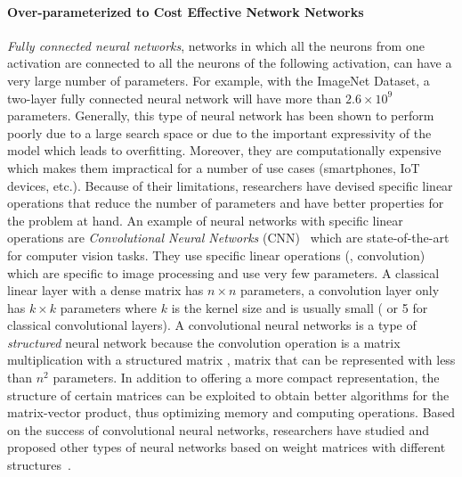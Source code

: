 \paragraph{Over-parameterized to Cost Effective Network Networks}
\emph{Fully connected neural networks}, networks in which all the neurons from one activation are connected to all the neurons of the following activation, can have a very large number of parameters.
For example, with the ImageNet Dataset, a two-layer fully connected neural network will have more than $2.6 \times 10^9$ parameters.
Generally, this type of neural network has been shown to perform poorly due to a large search space or due to the important expressivity of the model which leads to overfitting.
Moreover, they are computationally expensive which makes them impractical for a number of use cases (smartphones, IoT devices, etc.).
Because of their limitations, researchers have devised specific linear operations that reduce the number of parameters and have better properties for the problem at hand.
An example of neural networks with specific linear operations are \emph{Convolutional Neural Networks} (CNN)~\cite{lecun1998gradient,krizhevsky2012imagenet,he2016deep,tan2019efficientnet} which are state-of-the-art for computer vision tasks.
They use specific linear operations (\eg, convolution) which are specific to image processing and use very few parameters.  
A classical linear layer with a dense matrix has $n \times n$ parameters, a convolution layer only has $k \times k$ parameters where $k$ is the kernel size and is usually small ( or 5 for classical convolutional layers).
A convolutional neural networks is a type of \emph{structured} neural network because the convolution operation is a matrix multiplication with a structured matrix \ie, matrix that can be represented with less than $n^2$ parameters. 
In addition to offering a more compact representation, the structure of certain matrices can be exploited to obtain better algorithms for the matrix-vector product, thus optimizing memory and computing operations.
Based on the success of convolutional neural networks, researchers have studied and proposed other types of neural networks based on weight matrices with different structures~\cite{moczulski2016acdc,sindhwani2015structured,denil2013predicting}.

